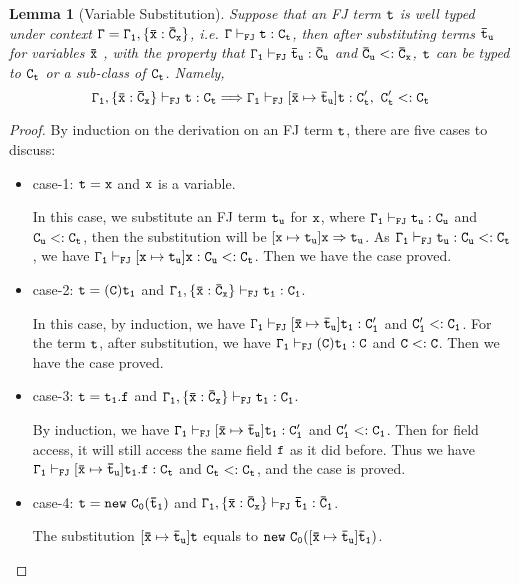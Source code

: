 \documentclass[letterpaper]{article}
\newtheorem{lemma}{Lemma}
\begin{document}
\begin{lemma}[Variable Substitution]
Suppose that an FJ term $\tt t$ is well typed under context $\tt \Gamma=\Gamma_1,\{\bar{x}:\bar{C}_x\}$, i.e. $\tt \Gamma\vdash_{FJ} t:C_t$, then after substituting terms $\tt \bar{t}_u$ for variables $\tt \bar{x}$ , with the property that $\tt\Gamma_1\vdash_{FJ}\bar{t}_u:\bar{C}_u$ and $\tt\bar{C}_u <: \bar{C}_x$, $\tt t$ can be typed to $\tt C_t$ or a sub-class of $\tt C_t$. Namely,
$$\tt \Gamma_1,\{\bar{x}:\bar{C}_x\} \vdash_{FJ} t:C_t \Longrightarrow \Gamma_1\vdash_{FJ} [\bar{x}\mapsto\bar{t}_u]t: C'_t,\ C'_t <: C_t$$
\end{lemma}
\begin{proof}
By induction on the derivation on an FJ term $\tt t$, there are five cases to discuss:
\begin{itemize}
\item case-1: $\tt t = x$ and $\tt x$ is a variable.

In this case, we substitute an FJ term $\tt t_u$ for $\tt x$, where $\tt \Gamma_1\vdash_{FJ} t_u:C_u$ and $\tt C_u <: C_t$, then the substitution will be $\tt [x\mapsto t_u]x\Rightarrow t_u$. As $\tt \Gamma_1\vdash_{FJ} t_u:C_u <:C_t$, we have $\tt \Gamma_1\vdash_{FJ}[x\mapsto t_u]x:C_u<:C_t$. Then we have the case proved.

\item case-2: $\tt t=(C)t_1$ and $\tt\Gamma_1,\{\bar{x}:\bar{C}_x\}\vdash_{FJ} t_1:C_1$.

In this case, by induction, we have $\tt \Gamma_1\vdash_{FJ}[\bar{x}\mapsto \bar{t}_u]t_1:C'_1$ and $\tt C'_1 <: C_1$. For the term $\tt t$, after substitution, we have $\tt\Gamma_1\vdash_{FJ}(C)t_1:C$ and $\tt C<:C$. Then we have the case proved.

\item case-3: $\tt t=t_1.f$ and $\tt \Gamma_1,\{\bar{x}:\bar{C}_x\}\vdash_{FJ}t_1:C_1$.

By induction, we have $\tt \Gamma_1\vdash_{FJ} [\bar{x}\mapsto \bar{t}_u]t_1:C'_1$ and $\tt C'_1<:C_1$. Then for field access, it will still access the same field $\tt f$ as it did before. Thus we have $\tt \Gamma_1\vdash_{FJ}[\bar{x}\mapsto \bar{t}_u]t_1.f:C_t$ and $\tt C_t<:C_t$, and the case is proved.

\item case-4: $\tt t=new~C_0(\bar{t}_1)$ and $\tt \Gamma_1,\{\bar{x}:\bar{C}_x\}\vdash_{FJ}\bar{t}_1:\bar{C}_1$.

The substitution $\tt[\bar{x}\mapsto \bar{t}_u]t$ equals to $\tt new~C_0([\bar{x}\mapsto\bar{t}_u]\bar{t}_1)$. 


\end{itemize}
\end{proof}
\end{document}
